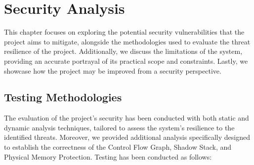 \chapter{Security Analysis}
\label{cha:ta}

This chapter focuses on exploring the potential security vulnerabilities that
the project aims to mitigate, alongside the methodologies used to evaluate the threat
resilience of the project. Additionally, we discuss the limitations of the system,
providing an accurate portrayal of its practical scope and constraints. Lastly,
we showcase how the project may be improved from a security perspective.

\section{Testing Methodologies}
\label{sec:ta_methodologies}

The evaluation of the project's security has been conducted with both static and
dynamic analysis techniques, tailored to assess the system's resilience to the
identified threats. Moreover, we provided additional analysis specifically
designed to establish the correctness of the Control Flow Graph, Shadow Stack,
and Physical Memory Protection. Testing has been conducted as follows:

